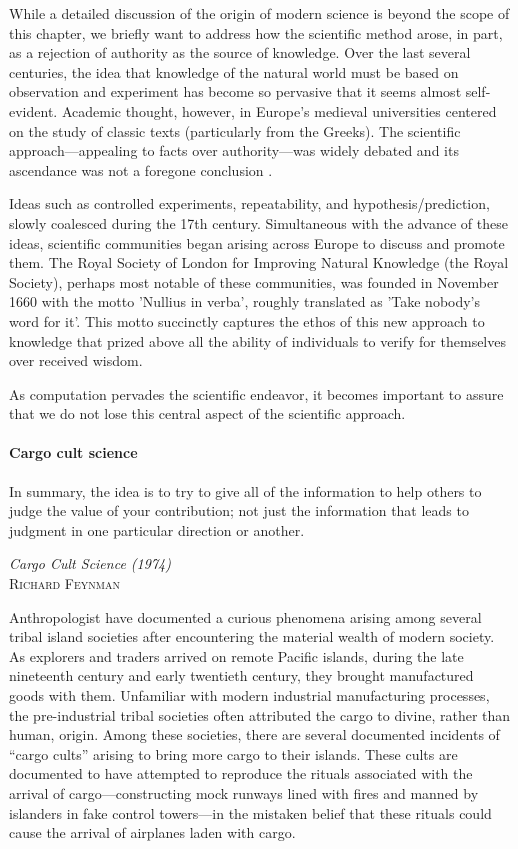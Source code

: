 \documentclass[ChapterTOCs,krantz2]{krantz} %
\begin{document}
While a detailed discussion of the origin of modern science is beyond the scope
of this chapter, we briefly want to address how the scientific method arose, in
part, as a rejection of authority as the source of knowledge. Over the last
several centuries, the idea that knowledge of the natural world must be based
on observation and experiment has become so pervasive that it seems almost
self-evident. Academic thought, however, in Europe's medieval universities
centered on the study of classic texts (particularly from the Greeks). The
scientific approach---appealing to facts over authority---was widely debated
and its ascendance was not a foregone conclusion \cite{shapin2011leviathan}.

Ideas such as controlled experiments, repeatability, and hypothesis/prediction,
slowly coalesced during the 17th century.  Simultaneous with the advance of these
ideas, scientific communities began arising across Europe to discuss and promote
them. The Royal Society of London for Improving Natural Knowledge (the Royal Society),
perhaps most notable of these communities, was founded in November 1660 with the motto
'Nullius in verba', roughly translated as 'Take nobody's word for it'. This motto
succinctly captures the ethos of this new approach to knowledge that prized above
all the ability of individuals to verify for themselves over received wisdom.

As computation pervades the scientific endeavor, it becomes important to assure
that we do not lose this central aspect of the scientific approach.

\paragraph{ {\bf Cargo cult science}}

\setlength{\epigraphrule}{0pt}
\setlength{\epigraphwidth}{.65\textwidth}
\epigraph%
{%
  In summary, the idea is to try to give all of the information to
  help others to judge the value of your contribution; not just the
  information that leads to judgment in one particular direction or
  another.
}%
{\textit{Cargo Cult Science (1974)}\\ \textsc{Richard Feynman} }


Anthropologist have documented a curious phenomena arising among several tribal
island societies after encountering the material wealth of modern society. As
explorers and traders arrived on remote Pacific islands, during the late
nineteenth century and early twentieth century, they brought manufactured goods
with them.  Unfamiliar with modern industrial manufacturing processes, the
pre-industrial tribal societies often attributed the cargo to divine, rather
than human, origin. Among these societies, there are several documented
incidents of ``cargo cults'' arising to bring more cargo to their islands.
These cults are documented to have attempted to reproduce the rituals associated
with the arrival of cargo---constructing mock runways lined with fires and manned
by islanders in fake control towers---in the mistaken
belief that these rituals could cause the arrival of airplanes laden with
cargo.
\end{document}
